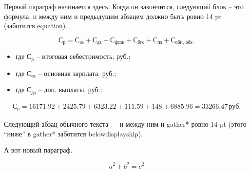 Первый параграф начинается здесь. Когда он закончится, 
следующий блок – это формула, и между ним и предыдущим 
абзацем должно быть ровно 14 pt (заботится equation).

\begin{equation}\label{eq:sum_expenses}
  \text{С}_\text{р} 
    = \text{С}_\text{оз} 
    + \text{С}_\text{дз} 
    + \text{С}_\text{фсзн} 
    + \text{С}_\text{бгс} 
    + \text{С}_\text{пз} 
    + \text{С}_\text{обп, обх}.
\end{equation}

\begin{symblock}
  \begin{itemize}[nosep,
                   leftmargin=0pt,
                   labelindent=0pt,
                   topsep=0pt,
                   partopsep=0pt,
                   itemsep=0pt,
                   parsep=0pt]
    \item[] где $\text{С}_\text{р}$ – итоговая себестоимость, руб.;
    \item[] где $\text{С}_\text{оз}$ – основная зарплата, руб.;
    \item[] где $\text{С}_\text{дз}$ – доп. выплаты, руб.;
  \end{itemize}
\end{symblock}

\begin{gather*}
  \text{С}_\text{р}
    = 16171.92 + 2425.79 + 6323.22 + 111.59 + 148 + 6885.96
    = 33266.47\,\text{руб.}
\end{gather*}

Следующий абзац обычного текста — и между ним и gather* ровно 14 pt 
(этого “ниже” в gather* заботится belowdisplayskip).


А вот новый параграф.  

\begin{equation}
  a^2 + b^2 = c^2
\end{equation}

